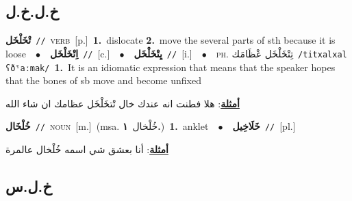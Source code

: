 \documentclass[10pt,a4paper,twoside]{article} %
\begin{document}
\begin{multicols}{2}
\vspace{-3mm}
\subsection*{\color{blue}\foreignlanguage{arabic}{خ.ل.خ.ل}\color{blue}{}} 

{\setlength\topsep{0pt}\textbf{\foreignlanguage{arabic}{تْخَلْخَل}}\ {\color{gray}\texttt{//}\color{black}}\ \textsc{verb}\ [p.]\ \textbf{1.}~dislocate  \textbf{2.}~move the several parts of sth because it is loose\ \ $\bullet$\ \ \setlength\topsep{0pt}\textbf{\foreignlanguage{arabic}{اِتْخَلْخَل}}\ {\color{gray}\texttt{//}\color{black}}\ [c.]\ \ $\bullet$\ \ \setlength\topsep{0pt}\textbf{\foreignlanguage{arabic}{يِتْخَلْخَل}}\ {\color{gray}\texttt{//}\color{black}}\ [i.]\ \ $\bullet$\ \ \textsc{ph.} \color{gray} \foreignlanguage{arabic}{تِتْخَلْخَل عْظَامَك}\color{black}\ {\color{gray}\texttt{/{\sffamily titxalxal ʕðˤaːmak}/}\color{black}}\ \textbf{1.}~It is an idiomatic expression that means that the speaker hopes that the bones of sb move and become unfixed\  \begin{flushright}\color{gray}\foreignlanguage{arabic}{\textbf{\underline{\foreignlanguage{arabic}{أمثلة}}}: هلا فطنت انه عندك خال تْتخَلْخَل عظامك ان شاء الله}\end{flushright}\color{black}} \vspace{2mm}

{\setlength\topsep{0pt}\textbf{\foreignlanguage{arabic}{خُلْخَال}}\ {\color{gray}\texttt{//}\color{black}}\ \textsc{noun}\ [m.]\ \color{gray}(msa. \foreignlanguage{arabic}{خُلْخال}~\foreignlanguage{arabic}{\textbf{١.}})\color{black}\ \textbf{1.}~anklet\ \ $\bullet$\ \ \setlength\topsep{0pt}\textbf{\foreignlanguage{arabic}{خَلَاخِيل}}\ {\color{gray}\texttt{//}\color{black}}\ [pl.]\  \begin{flushright}\color{gray}\foreignlanguage{arabic}{\textbf{\underline{\foreignlanguage{arabic}{أمثلة}}}: أنا بعشق شي اسمه خُلْخال عالمرة}\end{flushright}\color{black}} \vspace{2mm}

\vspace{-3mm}
\subsection*{\color{blue}\foreignlanguage{arabic}{خ.ل.س}\color{blue}{}} 


\end{multicols}
\end{document}
